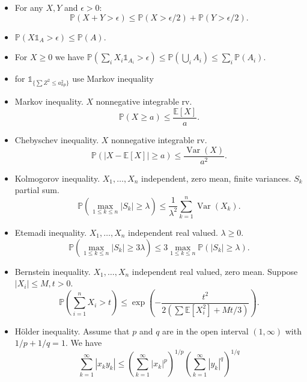 \documentclass[11pt,reqno]{amsart}
\newcommand{\E}{\mathbb{E}}
\renewcommand{\P}{\mathbb{P}}
\newcommand{\1}{\mathds{1}}
\newcommand{\Var}{\operatorname{Var}}
\newcommand{\0}{\boldsymbol{0}}
\newcommand{\4}{\mathchoice{\mskip1.5mu}{\mskip1.5mu}{}{}}
\newcommand{\5}{\mathchoice{\mskip-1.5mu}{\mskip-1.5mu}{}{}}
\newcommand{\2}{\penalty250\mskip\thickmuskip\mskip-\thinmuskip} %
\begin{document}
\begin{itemize}

\item For any $X,Y$ and $\epsilon>0$:
\begin{equation*}
\P(X+Y>\epsilon) \leq \P(X>\epsilon/2)+\P(Y>\epsilon/2).
\end{equation*}
\item $\P(X\1_A >\epsilon)\leq \P(A)$.
\item For $X\geq 0$ we have $\P(\sum_i X_i \1_{A_i} >\epsilon)\leq \P(\bigcup_i A_i)\leq \sum_i\P( A_i)$.

\item for $\1_{\{\sum Z^2\leq a_{np}^2\}}$ use Markov inequality
\item Markov inequality. $X$ nonnegative integrable rv.
\begin{equation*}
\P(X\geq a) \leq \frac{\E[X]}{a}.
\end{equation*}

\item Chebyschev inequality. $X$ nonnegative integrable rv.
\begin{equation*}
\P(|X-\E[X]|\geq a) \leq \frac{\Var(X)}{a^2}.
\end{equation*}

\item Kolmogorov inequality. $X_1, \ldots, X_n$ independent, zero mean, finite variances. $S_k$ partial sum.
\begin{equation*}
\P\left(\max_{1\leq k\leq n} |S_k| \geq \lambda\right) \leq \frac{1}{\lambda^2} \sum_{k=1}^n \Var(X_k).
\end{equation*}

\item Etemadi inequality. $X_1, \ldots, X_n$ independent real valued. $\lambda\geq 0$.
\begin{equation*}
\P\left(\max_{1\leq k\leq n} |S_k| \geq 3\lambda\right) \leq 3 \max_{1\leq k\leq n}\P\left( |S_k| \geq \lambda\right).
\end{equation*}

\item Bernstein inequality. $X_1, \ldots, X_n$ independent real valued, zero mean. Suppose $|X_i|\leq M, t>0$.
\begin{equation*}
\P\left(\sum_{i=1}^n X_i >t \right) \leq \exp \left( -\frac{t^2}{2(\sum \E[X_i^2] +Mt/3)}\right).
\end{equation*}

\item H\"older inequality. Assume that $p$ and $q$ are in the open interval $(1,\infty)$ with $1/p + 1/q = 1$. We have
\begin{equation*}
\sum_{k=1}^\infty |x_k y_k| \leq \left(\sum_{k=1}^\infty |x_k|^p \right)^{1/p} \left(\sum_{k=1}^\infty |y_k|^q \right)^{1/q}
\end{equation*}


\end{itemize}
\end{document}
